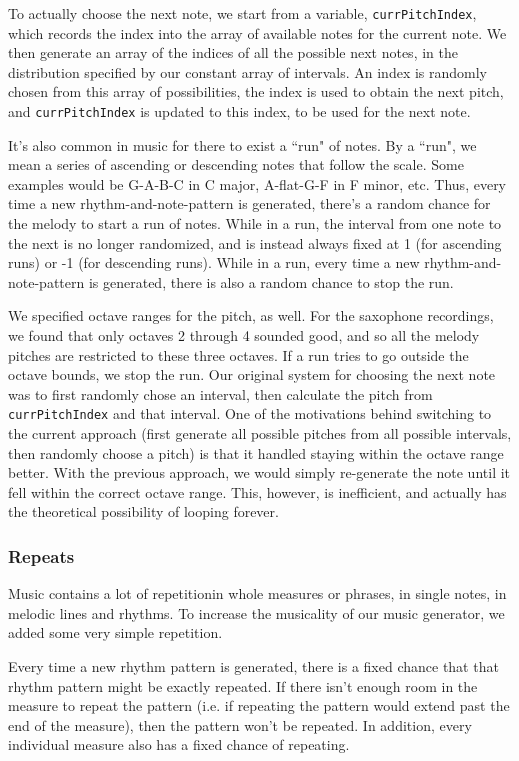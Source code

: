 \documentclass[12pt,a4paper]{article}
\newcommand{\lightcode}[1]{\colorbox{light-gray}{\texttt{#1}}}
\begin{document}
To actually choose the next note, we start from a variable, \lightcode{currPitchIndex}, which records the index into the array of available notes for the current note. We then generate an array of the indices of all the possible next notes, in the distribution specified by our constant array of intervals. An index is randomly chosen from this array of possibilities, the index is used to obtain the next pitch, and \lightcode{currPitchIndex} is updated to this index, to be used for the next note.

It's also common in music for there to exist a ``run" of notes. By a ``run", we mean a series of ascending or descending notes that follow the scale. Some examples would be G-A-B-C in C major, A-flat-G-F in F minor, etc. Thus, every time a new rhythm-and-note-pattern is generated, there's a random chance for the melody to start a run of notes. While in a run, the interval from one note to the next is no longer randomized, and is instead always fixed at 1 (for ascending runs) or -1 (for descending runs). While in a run, every time a new rhythm-and-note-pattern is generated, there is also a random chance to stop the run.

We specified octave ranges for the pitch, as well. For the saxophone recordings, we found that only octaves 2 through 4 sounded good, and so all the melody pitches are restricted to these three octaves. If a run tries to go outside the octave bounds, we stop the run. Our original system for choosing the next note was to first randomly chose an interval, then calculate the pitch from \lightcode{currPitchIndex} and that interval. One of the motivations behind switching to the current approach (first generate all possible pitches from all possible intervals, then randomly choose a pitch) is that it handled staying within the octave range better. With the previous approach, we would simply re-generate the note until it fell within the correct octave range. This, however, is inefficient, and actually has the theoretical possibility of looping forever.

\subsubsection{Repeats}

Music contains a lot of repetition\textemdash in whole measures or phrases, in single notes, in melodic lines and rhythms. To increase the musicality of our music generator, we added some very simple repetition.

Every time a new rhythm pattern is generated, there is a fixed chance that that rhythm pattern might be exactly repeated. If there isn't enough room in the measure to repeat the pattern (i.e. if repeating the pattern would extend past the end of the measure), then the pattern won't be repeated. In addition, every individual measure also has a fixed chance of repeating.
\end{document}
